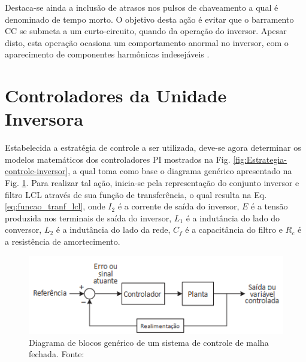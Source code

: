 Destaca-se ainda a inclusão de atrasos nos pulsos de chaveamento a qual é denominado de tempo morto. O objetivo desta ação é evitar que o barramento CC se submeta a um curto-circuito, quando da operação do inversor. Apesar disto, esta operação ocasiona um comportamento anormal no inversor, com o aparecimento de componentes harmônicas indesejáveis \cite{DissertacaoLeandro}. 

\section{Controladores da Unidade Inversora}

Estabelecida a estratégia de controle a ser utilizada, deve-se agora determinar os modelos matemáticos dos controladores PI mostrados na Fig. \ref{fig:Estrategia-controle-inversor}, a qual toma como base o diagrama genérico apresentado na Fig. \ref{fig:Controlador_Pi_Generico}. Para realizar tal ação, inicia-se pela representação do conjunto inversor e filtro LCL através de sua função de transferência, o qual resulta na Eq. \ref{eq:funcao_tranf_lcl}, onde $I_2$ é a corrente de saída do inversor, $E$ é a tensão produzida nos terminais de saída do inversor, $L_1$ é a indutância do lado do conversor, $L_2$ é a indutância do lado da rede, $C_f$ é a capacitância do filtro e $R_c$ é a resistência de amortecimento.

\begin{figure}[!hbt]
	\begin{center}
		\includegraphics[width=\columnwidth]{figuras/Controlador_PI_Generico.PNG}
		\caption{Diagrama de blocos genérico de um sistema de controle de malha fechada. Fonte: \cite{DissertacaoLeandro}}
		\label{fig:Controlador_Pi_Generico}
	\end{center}
\end{figure}

